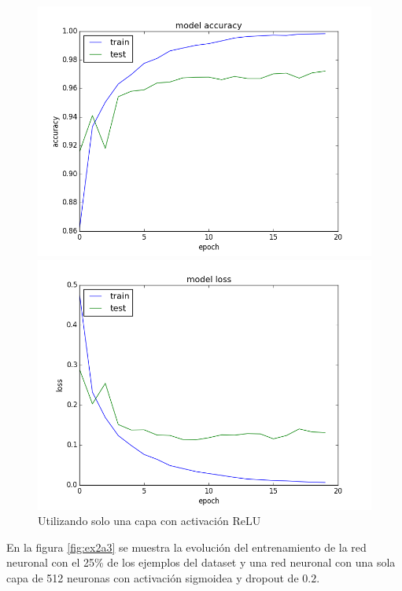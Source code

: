 \documentclass[11pt,spanish]{article}
\begin{document}
\begin{figure}[tpb]
\centering
\begin{minipage}{.5\textwidth}
  \centering
  \includegraphics[width=1\linewidth]{../ex2a2_acc.png}
\end{minipage}%
\begin{minipage}{.5\textwidth}
  \centering
  \includegraphics[width=1\linewidth]{../ex2a2_loss.png}
\end{minipage}
\caption{Utilizando solo una capa con activación ReLU}
\label{fig:ex2a2}
\end{figure}

En la figura \ref{fig:ex2a3} se muestra la evolución del entrenamiento de la red neuronal con el 25\% de los ejemplos del dataset y una red neuronal con una sola capa de 512 neuronas con activación sigmoidea y dropout de $0.2$. 
\end{document}

